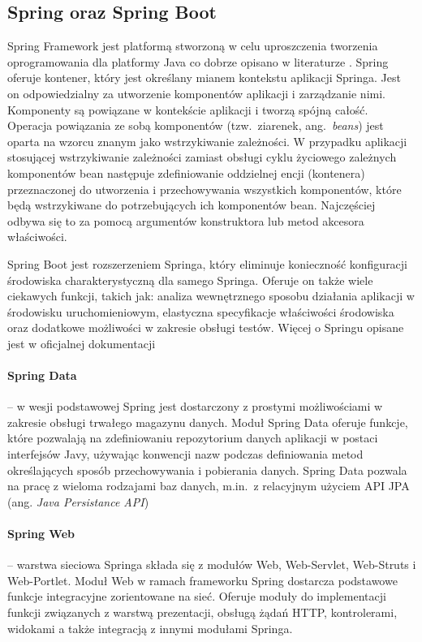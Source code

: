 \subsection{Spring oraz Spring Boot}
Spring Framework  jest platformą stworzoną w celu uproszczenia tworzenia oprogramowania dla platformy Java co dobrze opisano w literaturze \cite{spring}. Spring oferuje kontener, który jest określany mianem kontekstu aplikacji Springa. Jest on odpowiedzialny za utworzenie komponentów aplikacji i zarządzanie nimi. Komponenty są powiązane w kontekście aplikacji i tworzą spójną całość. Operacja powiązania ze sobą komponentów (tzw.\ ziarenek, ang.~\emph{beans}) jest oparta na wzorcu znanym jako wstrzykiwanie zależności. W przypadku aplikacji stosującej wstrzykiwanie zależności zamiast obsługi cyklu życiowego zależnych komponentów bean następuje zdefiniowanie oddzielnej encji (kontenera) przeznaczonej do utworzenia i przechowywania wszystkich komponentów, które będą wstrzykiwane do potrzebujących ich komponentów bean. Najczęściej odbywa się to za pomocą argumentów konstruktora lub metod akcesora właściwości. 

Spring Boot jest rozszerzeniem Springa, który eliminuje konieczność konfiguracji środowiska charakterystyczną dla samego Springa. Oferuje on także wiele ciekawych funkcji, takich jak: analiza wewnętrznego sposobu działania aplikacji w środowisku uruchomieniowym, elastyczna specyfikacje właściwości środowiska oraz dodatkowe możliwości w zakresie obsługi testów. Więcej o Springu opisane jest w oficjalnej dokumentacji \cite{springDoc}

\paragraph{Spring Data} -- w wesji podstawowej Spring jest dostarczony z prostymi możliwościami w zakresie obsługi trwałego magazynu danych. Moduł Spring Data oferuje funkcje, które pozwalają na zdefiniowaniu repozytorium danych aplikacji w postaci interfejsów Javy, używając konwencji nazw podczas definiowania metod określających sposób przechowywania i pobierania danych. Spring Data pozwala na pracę z wieloma rodzajami baz danych, m.in.\ z relacyjnym użyciem API JPA (ang. \emph{Java Persistance API})

\paragraph{Spring Web} -- warstwa sieciowa Springa składa się z modułów Web, Web-Servlet, Web-Struts i Web-Portlet. Moduł Web w ramach frameworku Spring dostarcza podstawowe funkcje integracyjne zorientowane na sieć. Oferuje moduły do implementacji funkcji związanych z warstwą prezentacji, obsługą żądań HTTP, kontrolerami, widokami a także integracją z innymi modułami Springa.



